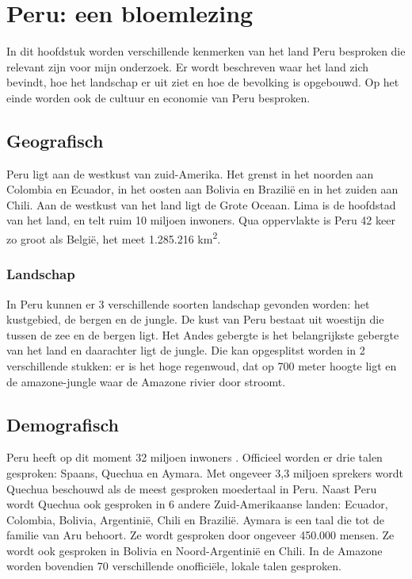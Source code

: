 \section{Peru: een bloemlezing}
In dit hoofdstuk worden verschillende kenmerken van het land Peru besproken die relevant zijn voor mijn onderzoek. Er wordt beschreven waar het land zich bevindt, hoe het landschap er uit ziet en hoe de bevolking is opgebouwd. Op het einde worden ook de cultuur en economie van Peru besproken.

\subsection{Geografisch}
Peru ligt aan de westkust van zuid-Amerika. Het grenst in het noorden aan Colombia en Ecuador, in het oosten aan Bolivia en Brazilië en in het zuiden aan Chili. Aan de westkust van het land ligt de Grote Oceaan. Lima is de hoofdstad van het land, en telt ruim 10 miljoen inwoners. Qua oppervlakte is Peru 42 keer zo groot als België, het meet 1.285.216 km\textsuperscript{2}. 

\subsubsection{Landschap}
In Peru kunnen er 3 verschillende soorten landschap gevonden worden: het kustgebied, de bergen en de jungle. De kust van Peru bestaat uit woestijn die tussen de zee en de bergen ligt. Het Andes gebergte is het belangrijkste gebergte van het land en daarachter ligt de jungle. Die kan opgesplitst worden in 2 verschillende stukken: er is het hoge regenwoud, dat op 700 meter hoogte ligt en de amazone-jungle waar de Amazone rivier door stroomt.  \autocite{ToPeru2020}

\subsection{Demografisch}
Peru heeft op dit moment 32 miljoen inwoners \autocite{Overheid2020}. Officieel worden er drie talen gesproken: Spaans, Quechua en Aymara. 
Met ongeveer 3,3 miljoen sprekers wordt Quechua beschouwd als de meest gesproken moedertaal in Peru. Naast Peru wordt Quechua ook gesproken in 6 andere Zuid-Amerikaanse landen: Ecuador, Colombia, Bolivia, Argentinië, Chili en Brazilië. \autocite{Cultura2020}
Aymara is een taal die tot de familie van Aru behoort. Ze wordt gesproken door ongeveer 450.000 mensen. \autocite{CulturaPeru2020} Ze wordt ook gesproken in Bolivia en Noord-Argentinië en Chili. In de Amazone worden bovendien 70 verschillende onofficiële, lokale talen gesproken. \autocite{dosmanosperu}


